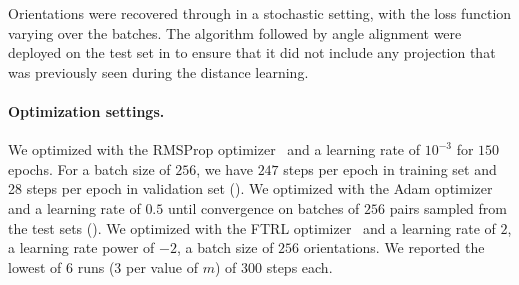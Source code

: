 Orientations were recovered through  in a stochastic setting, with the loss function varying over the batches. The algorithm followed by angle alignment were deployed on the test set in  to ensure that it did not include any projection that was previously seen during the distance learning.

\paragraph{Optimization settings.}
We optimized  with the RMSProp optimizer~\cite{tieleman2012rmsprop} and a learning rate of $10^{-3}$ for $150$ epochs. For a batch size of $256$, we have $247$ steps per epoch in training set and 28 steps per epoch in validation set ().
We optimized  with the Adam optimizer~\cite{kingma2014adam} and a learning rate of $0.5$ until convergence on batches of $256$ pairs sampled from the test sets ().
We optimized  with the FTRL optimizer~\cite{mcmahan2013ftrl} and a learning rate of $2$, a learning rate power of $-2$, a batch size of $256$ orientations. We reported the lowest of 6 runs (3 per value of $m$) of 300 steps each.

